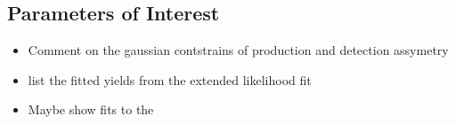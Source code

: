 \subsection{Parameters of Interest}



\begin{itemize}
\item Comment on the gaussian contstrains of production and detection assymetry
\item list the fitted yields from the extended likelihood fit
\item Maybe show fits to the \BdJpsiKst
\end{itemize}

